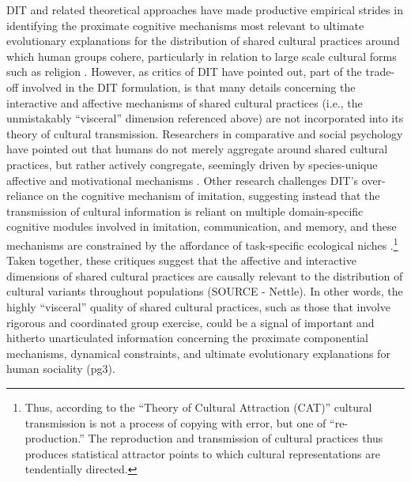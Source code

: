 \documentclass[12pt]{report}
\begin{document}
DIT and related theoretical approaches have made productive empirical strides in identifying the proximate cognitive mechanisms most relevant to ultimate evolutionary explanations for the distribution of shared cultural practices around which human groups cohere, particularly in relation to large scale cultural forms such as religion \citep{Henrich2015,Purzycki2016b}. However, as critics of DIT have pointed out, part of the trade-off involved in the DIT formulation, is that many details concerning the interactive and affective mechanisms of shared cultural practices (i.e., the unmistakably ``visceral'' dimension referenced above) are not incorporated into its theory of cultural transmission. Researchers in comparative and social psychology have pointed out that humans do not merely aggregate around shared cultural practices, but rather actively congregate, seemingly driven by species-unique affective and motivational mechanisms \citep{Dunbar2010,Tomasello2005a}.  Other research challenges DIT's over-reliance on the cognitive mechanism of imitation, suggesting instead that the transmission of cultural information is reliant on multiple domain-specific cognitive modules involved in imitation, communication, and memory, and these mechanisms are constrained by the affordance of task-specific ecological niches \citep{Sperber2004,Claidiere2007a}.\footnote{Thus, according to the ``Theory of Cultural Attraction (CAT)'' cultural transmission is not a process of copying with error, but one of ``re-production.'' The reproduction and transmission of cultural practices thus produces statistical attractor points to which cultural representations are tendentially directed.} Taken together, these critiques suggest that the affective and interactive dimensions of shared cultural practices are causally relevant to the distribution of cultural variants throughout populations (SOURCE - Nettle).  In other words, the highly ``visceral'' quality of shared cultural practices, such as those that involve rigorous and coordinated group exercise, could be a signal of important and hitherto unarticulated information concerning the proximate componential mechanisms, dynamical constraints, and ultimate evolutionary explanations for human sociality \citep{Claidiere2014} (pg3).
\end{document}
